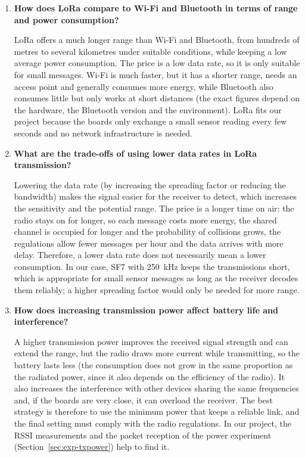 \documentclass[informe,english]{plantilla}
\begin{document}
\begin{enumerate}[label=\textbf{Q\arabic*.}, leftmargin=*]
    \item \textbf{How does LoRa compare to Wi-Fi and Bluetooth in terms of range and power consumption?}

    LoRa offers a much longer range than Wi-Fi and Bluetooth, from hundreds of metres to several kilometres under suitable conditions, while keeping a low average power consumption. The price is a low data rate, so it is only suitable for small messages. Wi-Fi is much faster, but it has a shorter range, needs an access point and generally consumes more energy, while Bluetooth also consumes little but only works at short distances (the exact figures depend on the hardware, the Bluetooth version and the environment). LoRa fits our project because the boards only exchange a small sensor reading every few seconds and no network infrastructure is needed.

    \item \textbf{What are the trade-offs of using lower data rates in LoRa transmission?}

    Lowering the data rate (by increasing the spreading factor or reducing the bandwidth) makes the signal easier for the receiver to detect, which increases the sensitivity and the potential range. The price is a longer time on air: the radio stays on for longer, so each message costs more energy, the shared channel is occupied for longer and the probability of collisions grows, the regulations allow fewer messages per hour and the data arrives with more delay. Therefore, a lower data rate does not necessarily mean a lower consumption. In our case, SF7 with 250~kHz keeps the transmissions short, which is appropriate for small sensor messages as long as the receiver decodes them reliably; a higher spreading factor would only be needed for more range.

    \item \textbf{How does increasing transmission power affect battery life and interference?}

    A higher transmission power improves the received signal strength and can extend the range, but the radio draws more current while transmitting, so the battery lasts less (the consumption does not grow in the same proportion as the radiated power, since it also depends on the efficiency of the radio). It also increases the interference with other devices sharing the same frequencies and, if the boards are very close, it can overload the receiver. The best strategy is therefore to use the minimum power that keeps a reliable link, and the final setting must comply with the radio regulations. In our project, the RSSI measurements and the packet reception of the power experiment (Section~\ref{sec:exp-txpower}) help to find it.
\end{enumerate}
\end{document}
